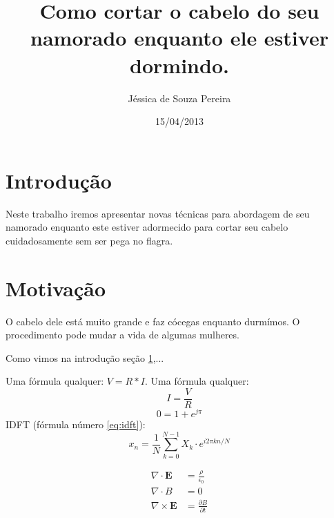 \documentclass{article}
\author{Jéssica de Souza Pereira}
\date{15/04/2013}
\title{Como cortar o cabelo do seu namorado enquanto ele estiver dormindo.}
\newcommand{\vetor}[1]{\textbf{#1}}
\begin{document}
\maketitle
\newpage
\section{Introdução}
\label{sec:intro}
Neste trabalho iremos apresentar novas técnicas para abordagem de seu namorado enquanto este estiver adormecido para cortar seu cabelo cuidadosamente sem ser pega no flagra.
\section{Motivação}
\label{sec:motiv}
O cabelo dele está muito grande e faz cócegas enquanto durmímos. O procedimento pode mudar a vida de algumas mulheres.

Como vimos na introdução {seção \ref{sec:intro}},...

Uma fórmula qualquer: $V = R*I$.
Uma fórmula qualquer: $$I = \frac{V}{R}$$
$$0=1+e^{j\pi}$$
IDFT (fórmula número \ref{eq:idft}):
\begin{equation}
\label{eq:idft}
x_n = \frac{1}{N}\sum_{k = 0}^{N-1} X_k \cdot e^{i2\pi kn/N}
\end{equation}

\begin{align}
\nabla \cdot \vetor{E} & = \frac{\rho}{\epsilon_0} \\
\nabla \cdot B & = 0 \\
\nabla \times \vetor{E} & = \frac{\partial B}{\partial t}
\end{align}
\end{document}
